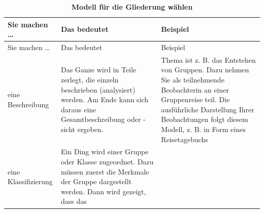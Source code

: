 \documentclass[]{book}
\theoremstyle{definition}
\theoremstyle{definition}
\theoremstyle{definition}
\theoremstyle{remark}
\begin{document}
\begin{longtable}[]{@{}lll@{}}
\caption{\textbf{\label{tab:gliederung2} Modell für die Gliederung
wählen}}\tabularnewline
\toprule
\begin{minipage}[b]{0.14\columnwidth}\raggedright\strut
Sie machen \ldots{}\strut
\end{minipage} & \begin{minipage}[b]{0.36\columnwidth}\raggedright\strut
Das bedeutet\strut
\end{minipage} & \begin{minipage}[b]{0.41\columnwidth}\raggedright\strut
Beispiel\strut
\end{minipage}\tabularnewline
\midrule
\endfirsthead
\toprule
\begin{minipage}[b]{0.14\columnwidth}\raggedright\strut
Sie machen \ldots{}\strut
\end{minipage} & \begin{minipage}[b]{0.36\columnwidth}\raggedright\strut
Das bedeutet\strut
\end{minipage} & \begin{minipage}[b]{0.41\columnwidth}\raggedright\strut
Beispiel\strut
\end{minipage}\tabularnewline
\midrule
\endhead
\begin{minipage}[t]{0.14\columnwidth}\raggedright\strut
eine Beschreibung\strut
\end{minipage} & \begin{minipage}[t]{0.36\columnwidth}\raggedright\strut
Das Ganze wird in Teile zerlegt, die einzeln beschrieben (analysiert)
werden. Am Ende kann sich daraus eine Gesamtbeschreibung oder -sicht
ergeben.\strut
\end{minipage} & \begin{minipage}[t]{0.41\columnwidth}\raggedright\strut
Thema ist z. B. das Entstehen von Gruppen. Dazu nehmen Sie als
teilnehmende Beobachterin an einer Gruppenreise teil. Die ausführliche
Darstellung Ihrer Beobachtungen folgt diesem Modell, z. B. in Form eines
Reisetagebuchs \vspace{-6mm}\strut
\end{minipage}\tabularnewline
\begin{minipage}[t]{0.14\columnwidth}\raggedright\strut
eine Klassifizierung\strut
\end{minipage} & \begin{minipage}[t]{0.36\columnwidth}\raggedright\strut
Ein Ding wird einer Gruppe oder Klasse zugeordnet. Dazu müssen zuerst
die Merkmale der Gruppe dargestellt werden. Dann wird gezeigt, dass das

\end{minipage}
\end{longtable}
\end{document}
